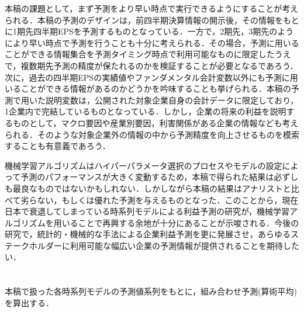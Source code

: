 \documentclass[a4paper，11pt]{jsarticle}
\begin{document}
本稿の課題として，まず予測をより早い時点で実行できるようにすることが考えられる．本稿の予測のデザインは，前四半期決算情報の開示後，その情報をもとに1期先四半期EPSを予測するものとなっている．一方で，2期先，3期先のようにより早い時点で予測を行うことも十分に考えられる．その場合，予測に用いることができる情報集合を予測タイミング時点で利用可能なものに限定したうえで，複数期先予測の精度が保たれるのかを検証することが必要となるであろう．次に，過去の四半期EPSの実績値やファンダメンタル会計変数以外にも予測に用いることができる情報があるのかどうかを吟味することも挙げられる．本稿の予測で用いた説明変数は，公開された対象企業自身の会計データに限定しており，1企業内で完結しているものとなっている．しかし，企業の将来の利益を説明するものとして，マクロ要因や産業別要因，利害関係がある企業の情報なども考えられる．そのような対象企業外の情報の中から予測精度を向上させるものを模索することも有意義であろう．

機械学習アルゴリズムはハイパーパラメータ選択のプロセスやモデルの設定によって予測のパフォーマンスが大きく変動するため，本稿で得られた結果は必ずしも最良なものではないかもしれない．しかしながら本稿の結果はアナリストと比べて劣らない，もしくは優れた予測を与えるものとなった．このことから，現在日本で衰退してしまっている時系列モデルによる利益予測の研究が，機械学習アルゴリズムを用いることで再興する余地が十分にあることが示唆される．今後の研究で，統計的・機械的な手法による企業利益予測を更に発展させ，あらゆるステークホルダーに利用可能な幅広い企業の予測情報が提供されることを期待したい．


\newpage
{}

% 
% 


\newpage
\appendix

\section{} \label{app:comb}
本稿で扱った各時系列モデルの予測値系列をもとに，組み合わせ予測(算術平均)を算出する．
\end{document}
